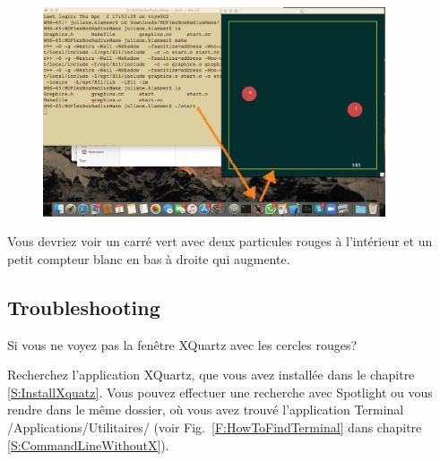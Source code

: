 \documentclass{article}
\newcommand\fig[1]{{Fig.~\ref{#1}}}
\begin{document}
\begin{figure}[H]
\center
\includegraphics[width=0.9\textwidth]{Plots/MD_4XQuartz.png}
\end{figure}
Vous devriez voir un carré vert avec deux particules rouges à l'intérieur et un petit compteur blanc en bas à droite qui augmente.
\subsection{Troubleshooting}
Si vous ne voyez pas la fenêtre XQuartz avec les cercles rouges?

Recherchez l'application XQuartz, que vous avez installée dans le chapitre \ref{S:InstallXquatz}. Vous pouvez effectuer une recherche avec Spotlight ou vous rendre dans le même dossier, où vous avez trouvé l'application Terminal /Applications/Utilitaires/ (voir \fig{F:HowToFindTerminal} dans chapitre \ref{S:CommandLineWithoutX}). 
\end{document}
